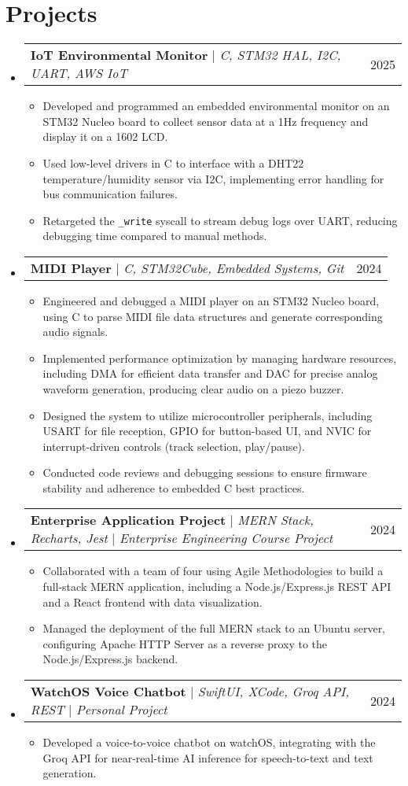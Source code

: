 \documentclass[letterpaper,11pt]{article}
\makeatletter
\newcommand{\resumeItem}[1]{
  \item\small{
    {#1 \vspace{-2pt}}
  }
}
\newcommand{\resumeProjectHeading}[2]{
    \item
    \begin{tabular*}{0.97\textwidth}{l@{\extracolsep{\fill}}r}
      \small#1 & #2 \\
    \end{tabular*}\vspace{-7pt}
}
\newcommand{\resumeSubHeadingListStart}{\begin{itemize}[leftmargin=0.15in, label={}]}
\newcommand{\resumeSubHeadingListEnd}{\end{itemize}}
\newcommand{\resumeItemListStart}{\begin{itemize}}
\newcommand{\resumeItemListEnd}{\end{itemize}\vspace{-5pt}}
\makeatother
\begin{document}
\section{Projects}
    \resumeSubHeadingListStart
    \resumeProjectHeading
        {\textbf{IoT Environmental Monitor} $|$ \emph{C, STM32 HAL, I2C, UART, AWS IoT}}{2025}
        \resumeItemListStart
          \resumeItem{Developed and programmed an embedded environmental monitor on an STM32 Nucleo board to collect sensor data at a 1Hz frequency and display it on a 1602 LCD.}
          \resumeItem{Used low-level drivers in C to interface with a DHT22 temperature/humidity sensor via I2C, implementing error handling for bus communication failures.}
          \resumeItem{Retargeted the \texttt{\_write} syscall to stream debug logs over UART, reducing debugging time compared to manual methods.}
        \resumeItemListEnd
    \resumeProjectHeading
        {\textbf{MIDI Player} $|$ \emph{C, STM32Cube, Embedded Systems, Git}}{2024}
        \resumeItemListStart
            \resumeItem{Engineered and debugged a MIDI player on an STM32 Nucleo board, using C to parse MIDI file data structures and generate corresponding audio signals.}
            \resumeItem{Implemented performance optimization by managing hardware resources, including DMA for efficient data transfer and DAC for precise analog waveform generation, producing clear audio on a piezo buzzer.}
            \resumeItem{Designed the system to utilize microcontroller peripherals, including USART for file reception, GPIO for button-based UI, and NVIC for interrupt-driven controls (track selection, play/pause).}
            \resumeItem{Conducted code reviews and debugging sessions to ensure firmware stability and adherence to embedded C best practices.}
        \resumeItemListEnd
    \resumeProjectHeading
        {\textbf{Enterprise Application Project} $|$ \emph{MERN Stack, Recharts, Jest} $|$ \emph{Enterprise Engineering Course Project}}{2024}
        \resumeItemListStart
            \resumeItem{Collaborated with a team of four using Agile Methodologies to build a full-stack MERN application, including a Node.js/Express.js REST API and a React frontend with data visualization.}
            \resumeItem{Managed the deployment of the full MERN stack to an Ubuntu server, configuring Apache HTTP Server as a reverse proxy to the Node.js/Express.js backend.}
        \resumeItemListEnd
    \resumeProjectHeading
        {\textbf{WatchOS Voice Chatbot} $|$ \emph{SwiftUI, XCode, Groq API, REST} $|$ \emph{Personal Project}}{2024}
        \resumeItemListStart
            \resumeItem{Developed a voice-to-voice chatbot on watchOS, integrating with the Groq API for near-real-time AI inference for speech-to-text and text generation.}
        \resumeItemListEnd
      
    \resumeSubHeadingListEnd


  
\end{document}
